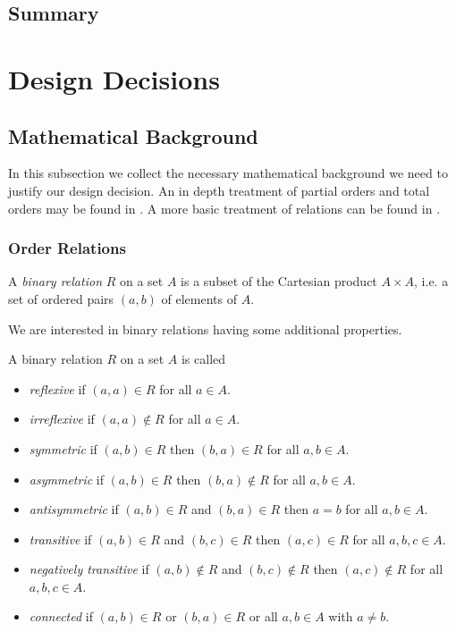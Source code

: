 ﻿\documentclass[a4paper,11pt,final]{article}
\numberwithin{equation}{subsection}
\begin{document}
\subsection{Summary}


\section{Design Decisions}
\subsection{Mathematical Background}
In this subsection we collect the necessary mathematical background we need to justify our design decision. An in depth treatment of partial orders and total orders may be found in \citet[chapitre III]{bourbaki}. A more basic treatment of relations can be found in \citet[chapter 4]{HowToProveIt}.

\subsubsection{Order Relations}
\begin{defi}
A \emph{binary relation} $R$ on a set $A$ is a subset of the Cartesian product $A\times A$, i.e. a set of ordered pairs $(a,b)$ of elements of $A$.
\end{defi}

We are interested in binary relations having some additional properties.
\begin{defi}
A binary relation $R$ on a set $A$ is called
\begin{itemize}
\item \emph{reflexive} if $(a,a)\in R$ for all $a\in A$.
\item \emph{irreflexive} if $(a,a)\notin R$ for all $a\in A$.
\item \emph{symmetric} if $(a,b)\in R$ then $(b,a)\in R$ for all $a,b\in A$.
\item \emph{asymmetric} if $(a,b)\in R$ then $(b,a)\notin R$ for all $a,b\in A$.
\item \emph{antisymmetric} if $(a,b)\in R$ and $(b,a)\in R$ then $a=b$ for all $a,b\in A$.
\item \emph{transitive} if $(a,b)\in R$ and $(b,c)\in R$ then $(a,c)\in R$ for all $a,b,c\in A$.
\item \emph{negatively transitive} if $(a,b)\notin R$ and $(b,c)\notin R$ then $(a,c)\notin R$ for all $a,b,c\in A$.
\item \emph{connected} if $(a,b)\in R$ or $(b,a)\in R$ or all $a,b\in A$ with $a\neq b$.
\end{itemize}
\end{defi}
\end{document}
